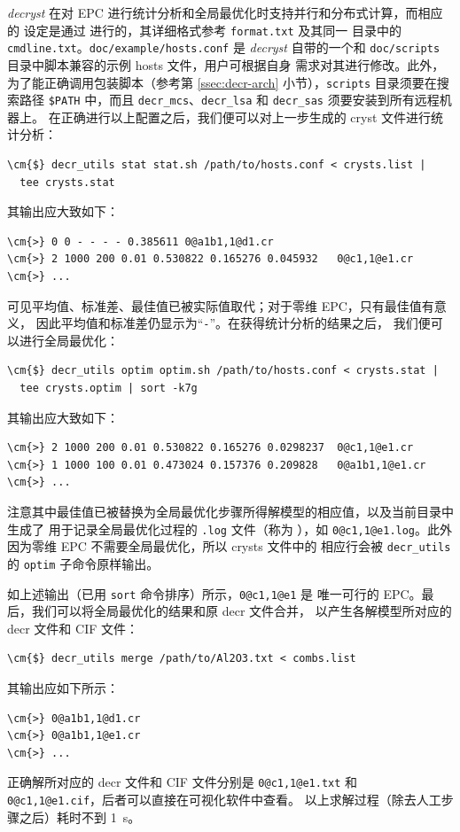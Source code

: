 \emph{decryst} 在对 EPC 进行统计分析和全局最优化时支持并行和分布式计算，而相应的
设定是通过 进行的，其详细格式参考 \verb|format.txt| 及其同一
目录中的 \verb|cmdline.txt|。\verb|doc/example/hosts.conf| 是 \emph{decryst}
自带的一个和 \verb|doc/scripts| 目录中脚本兼容的示例 hosts 文件，用户可根据自身
需求对其进行修改。此外，为了能正确调用包装脚本（参考第 \ref{ssec:decr-arch}
小节），\verb|scripts| 目录须要在搜索路径 \verb|$PATH| 中，而且
\verb|decr_mcs|、\verb|decr_lsa| 和 \verb|decr_sas| 须要安装到所有远程机器上。
在正确进行以上配置之后，我们便可以对上一步生成的 cryst 文件进行统计分析：
\begin{Verbatim}
\cm{$} decr_utils stat stat.sh /path/to/hosts.conf < crysts.list |
  tee crysts.stat
\end{Verbatim}
其输出应大致如下：
\begin{Verbatim}
\cm{>} 0 0 - - - - 0.385611	0@a1b1,1@d1.cr
\cm{>} 2 1000 200 0.01 0.530822 0.165276 0.045932	0@c1,1@e1.cr
\cm{>} ...
\end{Verbatim}
可见平均值、标准差、最佳值已被实际值取代；对于零维 EPC，只有最佳值有意义，
因此平均值和标准差仍显示为“\texttt{-}”。在获得统计分析的结果之后，
我们便可以进行全局最优化：
\begin{Verbatim}
\cm{$} decr_utils optim optim.sh /path/to/hosts.conf < crysts.stat |
  tee crysts.optim | sort -k7g
\end{Verbatim}
其输出应大致如下：
\begin{Verbatim}
\cm{>} 2 1000 200 0.01 0.530822 0.165276 0.0298237	0@c1,1@e1.cr
\cm{>} 1 1000 100 0.01 0.473024 0.157376 0.209828	0@a1b1,1@e1.cr
\cm{>} ...
\end{Verbatim}
注意其中最佳值已被替换为全局最优化步骤所得解模型的相应值，以及当前目录中生成了
用于记录全局最优化过程的 \verb|.log| 文件（称为 ），如
\verb|0@c1,1@e1.log|。此外因为零维 EPC 不需要全局最优化，所以 crysts 文件中的
相应行会被 \verb|decr_utils| 的 \verb|optim| 子命令原样输出。

如上述输出（已用 \verb|sort| 命令排序）所示，\verb|0@c1,1@e1| 是 
唯一可行的 EPC。最后，我们可以将全局最优化的结果和原 decr 文件合并，
以产生各解模型所对应的 decr 文件和 CIF 文件：
\begin{Verbatim}
\cm{$} decr_utils merge /path/to/Al2O3.txt < combs.list
\end{Verbatim}
其输出应如下所示：
\begin{Verbatim}
\cm{>} 0@a1b1,1@d1.cr
\cm{>} 0@a1b1,1@e1.cr
\cm{>} ...
\end{Verbatim}
正确解所对应的 decr 文件和 CIF 文件分别是 \verb|0@c1,1@e1.txt|
和 \verb|0@c1,1@e1.cif|，后者可以直接在可视化软件中查看。
以上求解过程（除去人工步骤之后）耗时不到 \SI{1}{\second}。

